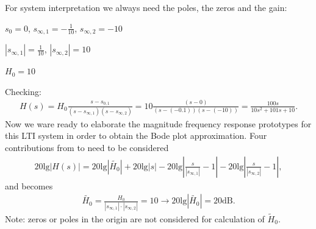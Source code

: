 \begin{ExCalc}
For system interpretation we always need the poles, the zeros and the gain:

$s_0=0$,
$s_{\infty,1}=-\frac{1}{10}$,
$s_{\infty,2}=-10$

$|s_{\infty,1}|=\frac{1}{10}$,
$|s_{\infty,2}|=10$

$H_0=10$

\begin{center}
\end{center}

Checking:
\begin{align}
H(s) = H_0\frac{s-s_{0,1}}{(s-s_{\infty,1})(s-s_{\infty,2})} = 10\frac{(s-0)}{(s-(-0.1))(s-(-10))}
=\frac{100 s}{10 s^2 + 101 s + 10}.
\end{align}
%
Now we ware ready to elaborate the magnitude frequency response prototypes for this
LTI system in order to obtain the Bode plot approximation.
%
Four contributions from  to  need to be considered
\begin{align}
20\mathrm{lg}|H(s)| = 20\mathrm{lg}|\tilde{H_0}| + 20\mathrm{lg}|s| - 20\mathrm{lg}|\frac{s}{|s_{\infty,1}|}-1|
- 20\mathrm{lg}|\frac{s}{|s_{\infty,2}|}-1|,
\end{align}
and  becomes
\begin{align}
\tilde{H_0} = \frac{H_0}{|s_{\infty,1}| \cdot |s_{\infty,2}|} = 10 \rightarrow 20\mathrm{lg}|\tilde{H_0}| = 20 \mathrm{dB}.
\end{align}
Note: zeros or poles in the origin are not considered for calculation of $\tilde{H}_0$.
\end{ExCalc}
